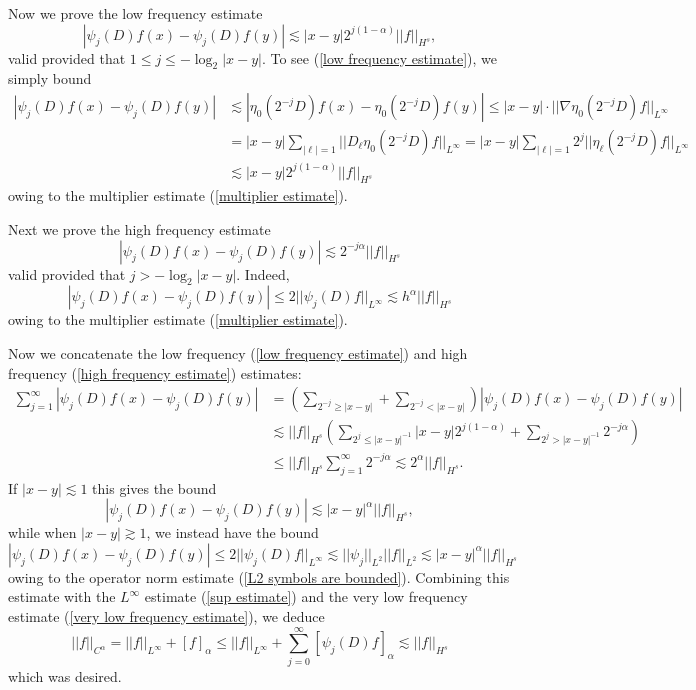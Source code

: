 \documentclass[10pt]{article}
\theoremstyle{definition}
\begin{document}
Now we prove the low frequency estimate
\begin{equation}
\label{low frequency estimate}
|\psi_j(D)f(x) - \psi_j(D)f(y)| \lesssim |x - y| 2^{j(1 - \alpha)} ||f||_{H^s},
\end{equation}
valid provided that $1 \leq j \leq -\log_2 |x - y|$. To see (\ref{low frequency estimate}), we simply bound
\begin{align*}
|\psi_j(D)f(x) - \psi_j(D)f(y)| &\lesssim |\eta_0(2^{-j}D)f(x) - \eta_0(2^{-j}D)f(y)| \leq |x - y| \cdot ||\nabla \eta_0(2^{-j}D)f||_{L^\infty}\\
&= |x - y| \sum_{|\ell| = 1} ||D_\ell \eta_0(2^{-j}D)f||_{L^\infty} = |x - y| \sum_{|\ell| = 1} 2^j ||\eta_\ell(2^{-j}D)f||_{L^\infty}\\
&\lesssim |x - y| 2^{j(1 - \alpha)} ||f||_{H^s}
\end{align*}
owing to the multiplier estimate (\ref{multiplier estimate}).

Next we prove the high frequency estimate
\begin{equation}
\label{high frequency estimate}
|\psi_j(D)f(x) - \psi_j(D)f(y)| \lesssim 2^{-j\alpha} ||f||_{H^s}
\end{equation}
valid provided that $j > -\log_2 |x - y|$. Indeed,
$$|\psi_j(D)f(x) - \psi_j(D)f(y)| \leq 2||\psi_j(D)f||_{L^\infty} \lesssim h^\alpha ||f||_{H^s}$$
owing to the multiplier estimate (\ref{multiplier estimate}).

Now we concatenate the low frequency (\ref{low frequency estimate}) and high frequency (\ref{high frequency estimate}) estimates:
\begin{align*}
\sum_{j=1}^\infty |\psi_j(D)f(x) - \psi_j(D)f(y)| &= \left(\sum_{2^{-j} \geq |x - y|} + \sum_{2^{-j} < |x - y|}\right) |\psi_j(D)f(x) - \psi_j(D)f(y)|\\
&\lesssim ||f||_{H^s} \left(\sum_{2^j \leq |x - y|^{-1}} |x - y|2^{j(1 - \alpha)} + \sum_{2^j > |x - y|^{-1}} 2^{-j\alpha}\right)\\
&\leq ||f||_{H^s} \sum_{j=1}^\infty 2^{-j\alpha} \lesssim 2^{\alpha} ||f||_{H^s}.
\end{align*}
If $|x - y| \lesssim 1$ this gives the bound
$$|\psi_j(D)f(x) - \psi_j(D)f(y)| \lesssim |x - y|^{\alpha} ||f||_{H^s},$$
while when $|x - y| \gtrsim 1$, we instead have the bound
$$|\psi_j(D)f(x) - \psi_j(D)f(y)| \leq 2||\psi_j(D)f||_{L^\infty} \lesssim ||\psi_j||_{L^2} ||f||_{L^2} \lesssim |x - y|^{\alpha} ||f||_{H^s}$$
owing to the operator norm estimate (\ref{L2 symbols are bounded}).
Combining this estimate with the $L^\infty$ estimate (\ref{sup estimate}) and the very low frequency estimate (\ref{very low frequency estimate}), we deduce
$$||f||_{C^\alpha} = ||f||_{L^\infty} + [f]_\alpha \leq ||f||_{L^\infty} + \sum_{j=0}^\infty [\psi_j(D)f]_\alpha \lesssim ||f||_{H^s}$$
which was desired.
\end{document}
